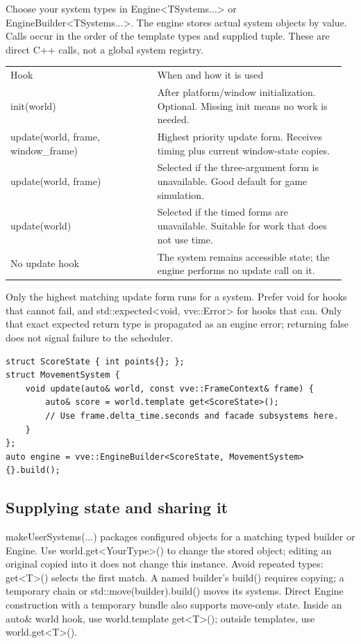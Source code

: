 \documentclass[11pt,a4paper]{article}
\begin{document}
Choose your system types in Engine<TSystems...> or EngineBuilder<TSystems...>. The engine stores actual system objects by value. Calls occur in the order of the template types and supplied tuple. These are direct C++ calls, not a global system registry.

{\small
\begin{longtable}{@{}p{0.42\linewidth}p{0.54\linewidth}@{}}
Hook & When and how it is used \\
init(world) & After platform/window initialization. Optional. Missing init means no work is needed. \\
update(world, frame, window\_frame) & Highest priority update form. Receives timing plus current window-state copies. \\
update(world, frame) & Selected if the three-argument form is unavailable. Good default for game simulation. \\
update(world) & Selected if the timed forms are unavailable. Suitable for work that does not use time. \\
No update hook & The system remains accessible state; the engine performs no update call on it. \\
\end{longtable}
}

Only the highest matching update form runs for a system. Prefer void for hooks that cannot fail, and std::expected<void, vve::Error> for hooks that can. Only that exact expected return type is propagated as an engine error; returning false does not signal failure to the scheduler.

\begin{lstlisting}[language={}]
struct ScoreState { int points{}; };
struct MovementSystem {
    void update(auto& world, const vve::FrameContext& frame) {
        auto& score = world.template get<ScoreState>();
        // Use frame.delta_time.seconds and facade subsystems here.
    }
};
auto engine = vve::EngineBuilder<ScoreState, MovementSystem>{}.build();
\end{lstlisting}

\subsection*{Supplying state and sharing it}
makeUserSystems(...) packages configured objects for a matching typed builder or Engine. Use world.get<YourType>() to change the stored object; editing an original copied into it does not change this instance. Avoid repeated types: get<T>() selects the first match. A named builder's build() requires copying; a temporary chain or std::move(builder).build() moves its systems. Direct Engine construction with a temporary bundle also supports move-only state. Inside an auto\& world hook, use world.template get<T>(); outside templates, use world.get<T>().
\end{document}
